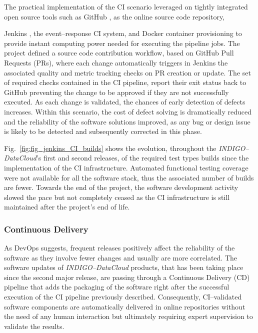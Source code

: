 \documentclass[journal]{IEEEtran}
\begin{document}
The practical implementation of the CI scenario leveraged on tightly integrated open
source tools such as GitHub \cite{github}, as the online source code repository,

Jenkins \cite{jenkins}, the event--response CI system, and Docker container
provisioning to provide instant computing power needed for executing the pipeline jobs.
The project defined a source code contribution workflow, based on GitHub Pull Requests
(PRs), where each change automatically triggers in Jenkins the associated quality and
metric tracking checks on PR creation or update. The set of required checks contained
in the CI pipeline, report their exit status back to GitHub preventing the change to be
approved if they are not successfully executed. As each change is validated, the chances
of early detection of defects increases. Within this scenario, the cost of defect solving
is dramatically reduced and the reliability of the software solutions improved, as any
bug or design issue is likely to be detected and subsequently corrected in this phase.

Fig.~\ref{fig:fig_jenkins_CI_builds} shows the evolution, throughout the
{\sl INDIGO--DataCloud}'s first and second releases, of the required test types builds since the
implementation of the CI infrastructure. Automated functional testing coverage were not
available for all the software stack, thus the associated number of builds are fewer. Towards the
end of the project, the software development activity slowed the pace but not completely ceased 
as the CI infrastructure is still maintained after the project's end of life.

\subsubsection{Continuous Delivery}
As DevOps suggests, frequent releases positively affect the reliability of the software as
they involve fewer changes and usually are more correlated. The software updates of
{\sl INDIGO--DataCloud} products, that has been taking place since the second major release, are passing through
a Continuous Delivery (CD) pipeline that adds the packaging of the software right after the
successful execution of the CI pipeline previously described. Consequently, CI--validated
software components are automatically delivered in online repositories without the need of
any human interaction but ultimately requiring expert supervision to validate the results.
\end{document}
